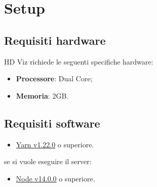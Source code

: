 \section{Setup}
    \subsection{Requisiti hardware}
    HD Viz richiede le seguenti specifiche hardware:
    \begin{itemize}
        \item \textbf{Processore}: Dual Core;
        \item \textbf{Memoria}: 2GB.
    \end{itemize}
    \subsection{Requisiti software}
        \begin{itemize}
            \item \href{https://yarnpkg.com/}{Yarn v1.22.0} o superiore.
        \end{itemize}
        se si vuole eseguire il server:
        \begin{itemize}
            \item \href{https://nodejs.org/en/}{Node v14.0.0} o superiore.
        \end{itemize}
